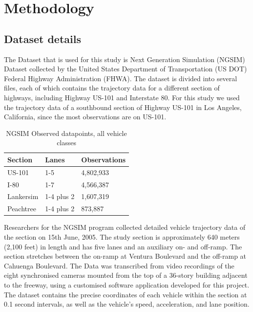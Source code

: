 \documentclass[11pt]{uonthesis}
\begin{document}
\chapter{Methodology}
\section{Dataset details}

The Dataset that is used for this study is Next Generation Simulation (NGSIM) Dataset \cite{ngsim} collected by the United States Department of Transportation (US DOT) Federal Highway Administration (FHWA). The dataset is divided into several files, each of which contains the trajectory data for a different section of highways, including Highway US-101 and Interstate 80. For this study we used the trajectory data of a southbound section of Highway US-101 in Los Angeles, California, since the most observations are on US-101.

\begin{table}[ht!]
    \centering
    \begin{tabular}{ |p{3cm}|p{3cm}|p{3cm}| }
        \hline
        Section & Lanes & Observations\\
        \hline
        US-101 & 1-5 & 4,802,933\\
        I-80 & 1-7 & 4,566,387\\ 
        Lankersim & 1-4 plus 2 & 1,607,319\\
        Peachtree & 1-4 plus 2 & 873,887\\
        \hline
    \end{tabular}
\caption{NGSIM Observed datapoints, all vehicle classes}
\end{table}

Researchers for the NGSIM program collected detailed vehicle trajectory data of the section on 15th June, 2005. The study section is approximately 640 meters (2,100 feet) in length and has five lanes and an auxiliary on- and off-ramp. The section stretches between the on-ramp at Ventura Boulevard and the off-ramp at Cahuenga Boulevard. The Data was transcribed from video recordings of the eight synchronised cameras mounted from the top of a 36-story building adjacent to the freeway, using a customised software application developed for this project. The dataset contains the precise coordinates of each vehicle within the section at 0.1 second intervals, as well as the vehicle's speed, acceleration, and lane position.
\end{document}
